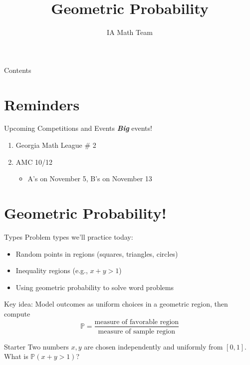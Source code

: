 \documentclass[aspectratio=169,xcolor=dvipsnames]{beamer}
\title[Geometric Probability]{Geometric Probability}
\author[IA Math Team]{IA Math Team}
\begin{document}
\begin{frame}[t]
  \titlepage
\end{frame}

\begin{frame}[t]{Contents}
  \tableofcontents
\end{frame}


\section{Reminders}

\begin{frame}[t]{Upcoming Competitions and Events}
    \textbf{\textit{Big}} events!

    \begin{enumerate}
        \item Georgia Math League \# 2  %
        \item AMC 10/12
        \begin{itemize}
            \item A's on November 5, B's on November 13
        \end{itemize}
    \end{enumerate}
\end{frame}

\section{Geometric Probability!}

\begin{frame}[t]{Types}
Problem types we’ll practice today:
\begin{itemize}
  \item Random points in regions (squares, triangles, circles)
  \item Inequality regions (e.g., $x+y>1$)
  \item Using geometric probability to solve word problems
\end{itemize}

\vspace{1.2cm}

Key idea: Model outcomes as uniform choices in a geometric region, then compute
\[
\boxed{\,\mathbb{P}=\dfrac{\text{measure of favorable region}}{\text{measure of sample region}}\,}
\]
\end{frame}

\begin{frame}[t]{Starter}
Two numbers $x,y$ are chosen independently and uniformly from $[0,1]$. What is $\mathbb{P}(x+y>1)$?

\end{frame}
\end{document}
